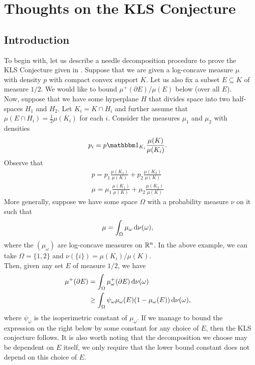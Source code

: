 \documentclass{article}
\begin{document}
\thispagestyle{empty}
\titleBC

\section{Thoughts on the KLS Conjecture}

\subsection{Introduction}

To begin with, let us describe a needle decomposition procedure to prove the KLS Conjecture given in \cite{leevempala2018klssurvey}. Suppose that we are given a log-concave measure $\mu$ with density $p$ with compact convex support $K$. Let us also fix a subset $E\subseteq K$ of measure $1/2$. We would like to bound $\mu^+(\partial E) / \mu(E)$ below (over all $E$).\\
Now, suppose that we have some hyperplane $H$ that divides space into two half-spaces $H_1$ and $H_2$. Let $K_i = K \cap H_i$ and further assume that $\mu(E \cap H_i) = \frac{1}{2}\mu(K_i)$ for each $i$. Consider the measures $\mu_1$ and $\mu_2$ with densities
\[ p_i = p \indic_{K_i} \frac{\mu(K)}{\mu(K_i)}. \]
Observe that
\begin{equation}
	\label{eqn 1}
	\begin{gathered}
		p = p_1 \frac{\mu(K_1)}{\mu(K)} + p_2 \frac{\mu(K_2)}{\mu(K)} \\
		\mu = \mu_1 \frac{\mu(K_1)}{\mu(K)} + \mu_2 \frac{\mu(K_2)}{\mu(K)}
	\end{gathered}
\end{equation}
More generally, suppose we have some space $\Omega$ with a probability measure $\nu$ on it such that
\begin{equation}
	\label{eqn 2: disintegration}
	\mu = \int_\Omega \mu_{\omega} \operatorname{d}\!{\nu}(\omega),
\end{equation}
where the $(\mu_\omega)$ are log-concave measures on $\mathbb{R}^n$. In the above example, we can take $\Omega = \{1,2\}$ and $\nu(\{i\}) = \mu(K_i) / \mu(K)$.\\
Then, given any set $E$ of measure $1/2$, we have
\begin{align}
	\mu^+(\partial E) &= \int_{\Omega} \mu_\omega^+(\partial E) \operatorname{d}\!{\nu}(\omega)  \nonumber \\
		&\geq \int_\Omega \psi_\omega \mu_\omega(E) (1-\mu_\omega(E)) \operatorname{d}\!{\nu}(\omega), \label{eqn 4}
\end{align}
where $\psi_\omega$ is the isoperimetric constant of $\mu_\omega$. If we manage to bound the expression on the right below by some constant for any choice of $E$, then the KLS conjecture follows. It is also worth noting that the decomposition we choose may be dependent on $E$ itself, we only require that the lower bound constant does not depend on this choice of $E$.
\end{document}
